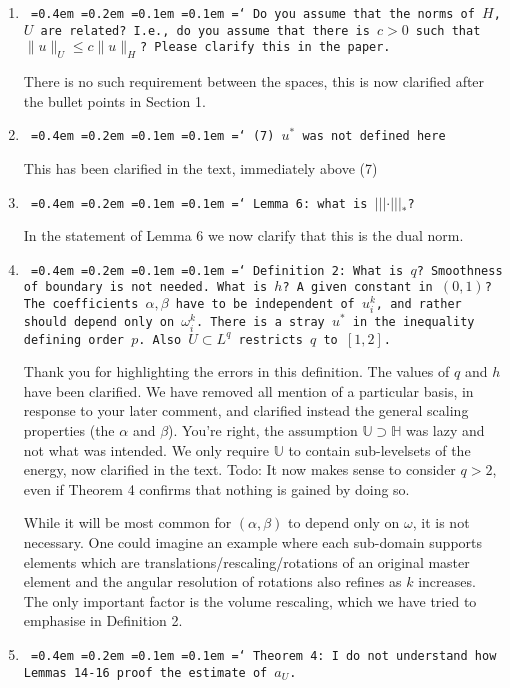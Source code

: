 \documentclass[12pt]{article}
\newcommand*\justify{%
	\fontdimen2\font=0.4em%
	\fontdimen3\font=0.2em%
	\fontdimen4\font=0.1em%
	\fontdimen7\font=0.1em%
	\hyphenchar\font=`\-%
}
\newcommand{\review}[1]{\texttt{\justify{#1}}}
\newcommand{\todo}[1]{{\color{red}Todo: #1}}
\newcommand{\F}[1]{\mathbb{#1}}
\begin{document}
\begin{enumerate}
	\item \review{Do you assume that the norms of $H$, $U$ are related? I.e., do you assume that there is $c>0$ such that $\lVert u\rVert_U\leq c\lVert u\rVert_H$? Please clarify this in the paper.} 
	
	There is no such requirement between the spaces, this is now clarified after the bullet points in Section 1.
	
	\item \review{(7) $u^*$ was not defined here}
	
	This has been clarified in the text, immediately above (7)

	\item \review{Lemma 6: what is $|||\cdot|||_*$?}
	
	In the statement of Lemma 6 we now clarify that this is the dual norm.

	\item \review{Definition 2: What is $q$? Smoothness of boundary is not needed. What is $h$? A given constant in $(0,1)$? The coefficients $\alpha,\beta$ have to be independent of $u_i^k$, and rather should depend only on $\omega_i^k$. There is a stray $u^*$ in the inequality defining order $p$. Also $U\subset L^q$ restricts $q$ to $[1,2]$.}
	
	Thank you for highlighting the errors in this definition. The values of $q$ and $h$ have been clarified. We have removed all mention of a particular basis, in response to your later comment, and clarified instead the general scaling properties (the $\alpha$ and $\beta$). You're right, the assumption $\F U\supset\F H$ was lazy and not what was intended. We only require $\F U$ to contain sub-levelsets of the energy, now clarified in the text. \todo{It now makes sense to consider $q>2$, even if Theorem 4 confirms that nothing is gained by doing so.}
	
	While it will be most common for $(\alpha,\beta)$ to depend only on $\omega$, it is not necessary. One could imagine an example where each sub-domain supports elements which are translations/rescaling/rotations of an original master element and the angular resolution of rotations also refines as $k$ increases. The only important factor is the volume rescaling, which we have tried to emphasise in Definition 2.
	
	\item \review{Theorem 4: I do not understand how Lemmas 14-16 proof the estimate of $a_U$.}


\end{enumerate}
\end{document}
